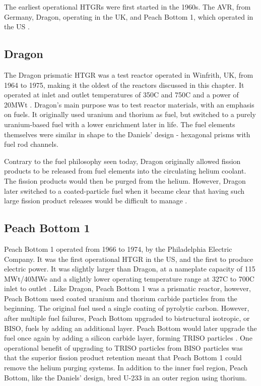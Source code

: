 The earliest operational HTGRs were first started in the 1960s.  The AVR, from Germany, Dragon, operating in the UK, and Peach Bottom 1, which operated in the US \cite{beck_high_nodate}.

\subsection{Dragon}

The Dragon prismatic HTGR was a test reactor operated in Winfrith, UK, from 1964 to 1975, making it the oldest of the reactors discussed in this chapter.  It operated at inlet and outlet temperatures of 350\textdegree  C and 750\textdegree  C and a power of 20MWt \cite{beck_high_nodate}.  Dragon's main purpose was to test reactor materials, with an emphasis on fuels.  It originally used uranium and thorium as fuel, but switched to a purely uranium-based fuel with a lower enrichment later in life.  The fuel elements themselves were similar in shape to the Daniels' design - hexagonal prisms with fuel rod channels.

Contrary to the fuel philosophy seen today, Dragon originally allowed fission products to be released from fuel elements into the circulating helium coolant.  The fission products would then be purged from the helium.  However, Dragon later switched to a coated-particle fuel when it became clear that having such large fission product releases would be difficult to manage \cite{simnad_early_1991}.

\subsection{Peach Bottom 1}

Peach Bottom 1 operated from 1966 to 1974, by the Philadelphia Electric Company.  It was the first operational HTGR in the US, and the first to produce electric power.  It was slightly larger than Dragon, at a nameplate capacity of 115 MWt/40MWe and a slightly lower operating temperature range at 327\textdegree  C to 700\textdegree  C inlet to outlet \cite{beck_high_nodate}.  Like Dragon, Peach Bottom 1 was a prismatic reactor, however, Peach Bottom used coated uranium and thorium carbide particles from the beginning.  The original fuel used a single coating of pyrolytic carbon.  However, after multiple fuel failures, Peach Bottom upgraded to bistructural isotropic, or BISO, fuels by adding an additional layer.  Peach Bottom would later upgrade the fuel once again by adding a silicon carbide layer, forming TRISO particles \cite{beck_high_nodate}.  One operational benefit of upgrading to TRISO particles from BISO particles was that the superior fission product retention meant that Peach Bottom 1 could remove the helium purging systems.  In addition to the inner fuel region, Peach Bottom, like the Daniels' design, bred U-233 in an outer region using thorium.


